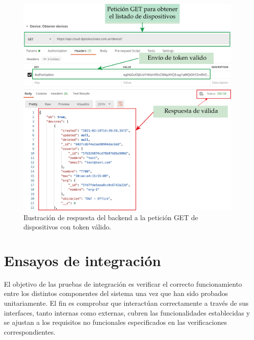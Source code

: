 \begin{figure}[htpb]
	\centering
	\includegraphics[scale=.90]{./Figures/devices-valid-token.png}
	\caption[Respuesta a petición de dispositivos con token válido]{Ilustración de respuesta del backend a la petición GET de dispositivos con token válido.}
	\label{fig:valid-token-dev}
\end{figure}




\section{Ensayos de integración}

El objetivo de las pruebas de integración es verificar el correcto funcionamiento entre los distintos componentes del sistema una vez que han sido probados unitariamente.  El fin es comprobar que interactúan correctamente a través de sus interfaces, tanto internas como externas, cubren las funcionalidades establecidas y se ajustan a los requisitos no funcionales especificados en las verificaciones correspondientes.


